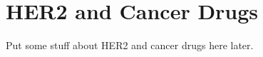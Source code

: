 \label{app:apdxb}
\section{HER2 and Cancer Drugs}

Put some stuff about HER2 and cancer drugs here later.
